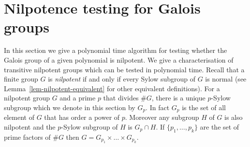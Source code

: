 \documentclass[11pt]{madras}%
\theoremstyle{remark}
\begin{document}
\section{Nilpotence testing for Galois groups}\label{sect-nilpotent}

In this section we give a polynomial time algorithm for testing
whether the Galois group of a given polynomial is nilpotent. We give a
characterisation of transitive nilpotent groups which can be tested
in polynomial time. Recall that a finite group $G$ is \emph{nilpotent}
if and only if every Sylow subgroup of $G$ is normal (see
Lemma~\ref{lem-nilpotent-equivalent} for other equivalent
definitions).  For a nilpotent group $G$ and a prime $p$ that divides
$\# G$, there is a unique $p$-Sylow subgroup which we denote in this
section by $G_p$. In fact $G_p$ is the set of all element of $G$ that
has order a power of $p$. Moreover any subgroup $H$ of $G$ is also
nilpotent and the $p$-Sylow subgroup of $H$ is $G_p \cap H$.  If $\{
p_1,\ldots,p_k \}$ are the set of prime factors of $\#G$ then $G =
G_{p_1} \times \ldots \times G_{p_k}$.
\end{document}
